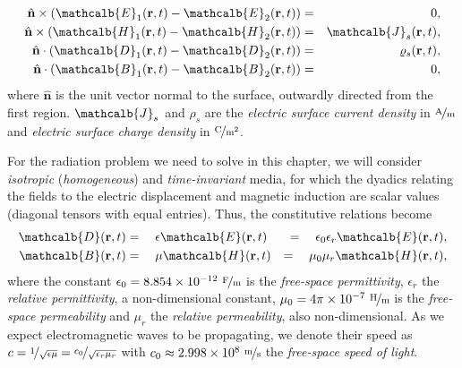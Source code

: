 \begin{eqnarray}
\hat{\mathbf{n}} \times \left ( \mathcalb{E}_1(\mathbf{r},t)-\mathcalb{E}_2(\mathbf{r},t) \right ) &= & 0,  \label{eq:conte1} \\
\hat{\mathbf{n}} \times \left ( \mathcalb{H}_1(\mathbf{r},t)-\mathcalb{H}_2(\mathbf{r},t) \right ) &= & \mathcalb{J}_s(\mathbf{r},t), \\
\hat{\mathbf{n}} \cdot \left ( \mathcalb{D}_1(\mathbf{r},t)-\mathcalb{D}_2(\mathbf{r},t) \right ) &= & \varrho_s(\mathbf{r},t), \\
\hat{\mathbf{n}} \cdot \left ( \mathcalb{B}_1(\mathbf{r},t)-\mathcalb{B}_2(\mathbf{r},t) \right ) &= & 0, \label{eq:contb1}
\end{eqnarray}
where $\hat{\mathbf{n}}$ is the unit vector normal to the surface, outwardly directed from the first region. $\mathcalb{J}_s$ and $\rho_s$ are the \textit{electric surface current density} in $\mathrm{\nicefrac{\mathrm A}{\mathrm m}}$ and \textit{electric surface charge density} in $\mathrm{\nicefrac{\mathrm C}{m^2}}$. %

\par For the radiation problem we need to solve in this chapter, we will consider \textit{isotropic} (\textit{homogeneous}) and \textit{time-invariant} media, for which the dyadics relating the fields to the electric displacement and magnetic induction are scalar values (diagonal tensors with equal entries). Thus, the constitutive relations become
\begin{eqnarray} 
\mathcalb{D}(\mathbf{r},t) &= \ \ \ \epsilon \mathcalb{E}(\mathbf{r},t) &= \ \ \ \epsilon_0 \epsilon_r \mathcalb{E}(\mathbf{r},t),  \label{eq:fsconst1}\\
\mathcalb{B}(\mathbf{r},t) &= \ \ \ \mu \mathcalb{H}(\mathbf{r},t)  &= \ \ \ \mu_0 \mu_r \mathcalb{H}(\mathbf{r},t), \label{eq:fsconst2}
\end{eqnarray}
where the constant $\epsilon_0 = 8.854 \times 10^{-12} \ \mathrm{\nicefrac{\mathrm F}{\mathrm m}}$ is the \textit{free-space permittivity}, $\epsilon_r$ the \textit{relative permittivity}, a non-dimensional constant, $\mu_0 = 4\pi \times 10^{-7} \ \mathrm{\nicefrac{\mathrm H}{\mathrm m}}$ is the \textit{free-space permeability} and $\mu_r$ the \textit{relative permeability}, also non-dimensional. As we expect electromagnetic waves to be propagating, we denote their speed as  $c = \nicefrac{1}{\sqrt{\epsilon \mu}} = \nicefrac{c_0}{\sqrt{\epsilon_r \mu_r}}$ with $c_0  \approx 2.998 \times 10^{8} \ \mathrm{\nicefrac{\mathrm m}{s}}$ the \textit{free-space speed of light}.

